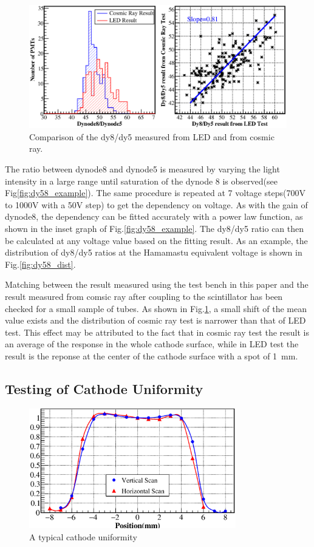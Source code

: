 \documentclass[5p, times]{elsarticle}
\begin{document}
\begin{figure}[]
 \centering
 \includegraphics[width=140mm]{dy58_ledvscm}
\caption{Comparison of the dy8/dy5 measured from LED and from cosmic ray.}
\label{fig:dy58_ledvscm}
\end{figure} 

The ratio between dynode8 and dynode5 is measured by varying the light intensity in a large range until saturation of the dynode 8 is observed(see Fig\ref{fig:dy58_example}).
The same procedure is repeated at 7 voltage steps(700V to 1000V with a 50V step) to get the dependency on voltage.
As with the gain of dynode8, the dependency can be fitted accurately with a power law function, as shown in the inset graph of Fig.\ref{fig:dy58_example}.
The dy8/dy5 ratio can then be calculated at any voltage value based on the fitting result.
As an example, the distribution of dy8/dy5 ratios at the Hamamastu equivalent voltage is shown in Fig.\ref{fig:dy58_dist}.

Matching between the result measured using the test bench in this paper and the result measured from comsic ray after coupling to the scintillator has been checked for a small sample of tubes.
As shown in Fig.\ref{fig:dy58_ledvscm}, a small shift of the mean value exists and the distribution of cosmic ray test is narrower than that of LED test. 
This effect may be attributed to the fact that in cosmic ray test the result is an average of the response in the whole cathode surface, while in LED test the result is the reponse at the center of the cathode surface with a spot of \SI{1}{\milli\meter}.


\subsection{Testing of Cathode Uniformity}
\label{sec:psd_cathodescan}

\begin{figure}[h!]
 \centering
 \includegraphics[width=90mm]{cathode_uniformity}
\caption{A typical cathode uniformity}
\label{fig:cathode_uniformity}
\end{figure} 
\end{document}
